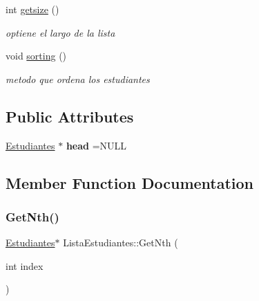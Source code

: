 \begin{DoxyCompactItemize}
int \hyperlink{classListaEstudiantes_a8db0ded4430c0f3457feaa24df975dfc}{getsize} ()
\begin{DoxyCompactList}\small\item\em optiene el largo de la lista \end{DoxyCompactList}\item 
\mbox{\label{classListaEstudiantes_a8752e25d665296c5ba801dab473b4e8c}} 
void \hyperlink{classListaEstudiantes_a8752e25d665296c5ba801dab473b4e8c}{sorting} ()
\begin{DoxyCompactList}\small\item\em metodo que ordena los estudiantes \end{DoxyCompactList}\end{DoxyCompactItemize}
\subsection*{Public Attributes}
\begin{DoxyCompactItemize}
\item 
\mbox{\label{classListaEstudiantes_ac3b7f8f472226575ef6731279d0fe8c9}} 
\hyperlink{classEstudiantes}{Estudiantes} $\ast$ {\bfseries head} =N\+U\+LL
\end{DoxyCompactItemize}


\subsection{Member Function Documentation}
\mbox{\label{classListaEstudiantes_acc9153be212f34a46849e233716a4e41}} 
\subsubsection{\texorpdfstring{Get\+Nth()}{GetNth()}}
{\footnotesize\ttfamily \hyperlink{classEstudiantes}{Estudiantes}$\ast$ Lista\+Estudiantes\+::\+Get\+Nth (\begin{DoxyParamCaption}\item[{int}]{index }\end{DoxyParamCaption})\hspace{0.3cm}{\ttfamily [inline]}}



